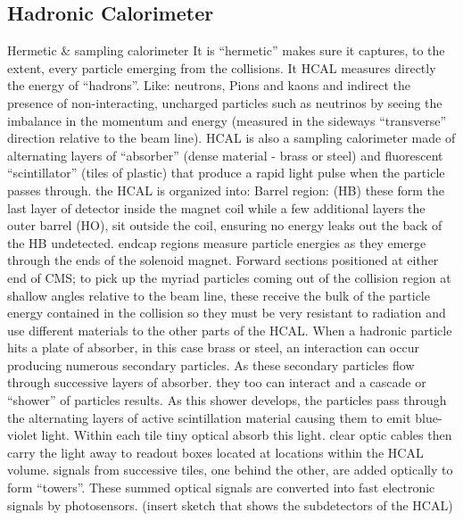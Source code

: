 \subsection{Hadronic Calorimeter}
Hermetic & sampling calorimeter
It is “hermetic” makes sure it captures, to the extent, every particle emerging from the collisions. It HCAL measures directly the energy of “hadrons”. Like: neutrons, Pions and kaons and indirect the presence of non-interacting, uncharged particles such as neutrinos by seeing the imbalance in the momentum and energy (measured in the sideways “transverse” direction relative to the beam line).
HCAL is also a sampling calorimeter made of alternating layers of “absorber” (dense material - brass or steel) and fluorescent “scintillator” (tiles of plastic) that produce a rapid light pulse when the particle passes through.
the HCAL is organized into: Barrel region: (HB) these form the last layer of detector inside the magnet coil while a few additional layers the outer barrel (HO), sit outside the coil, ensuring no energy leaks out the back of the HB undetected. endcap regions measure particle energies as they emerge through the ends of the solenoid magnet. Forward sections positioned at either end of CMS; to pick up the myriad particles coming out of the collision region at shallow angles relative to the beam line, these receive the bulk of the particle energy contained in the collision so they must be very resistant to radiation and use different materials to the other parts of the HCAL.
When a hadronic particle hits a plate of absorber, in this case brass or steel, an interaction can occur producing numerous secondary particles. As these secondary particles flow through successive layers of absorber. they too can interact and a cascade or “shower” of particles results.
As this shower develops, the particles pass through the alternating layers of active scintillation material causing them to emit blue-violet light. Within each tile tiny optical absorb this light. clear optic cables then carry the light away to readout boxes located at locations within the HCAL volume. signals from successive tiles, one behind the other, are added optically to form “towers”. These summed optical signals are converted into fast electronic signals by photosensors.
(insert sketch that shows the subdetectors of the HCAL)


